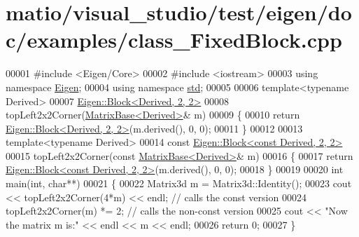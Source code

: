 \hypertarget{matio_2visual__studio_2test_2eigen_2doc_2examples_2class___fixed_block_8cpp_source}{}\section{matio/visual\+\_\+studio/test/eigen/doc/examples/class\+\_\+\+Fixed\+Block.cpp}
\label{matio_2visual__studio_2test_2eigen_2doc_2examples_2class___fixed_block_8cpp_source}

\begin{DoxyCode}
00001 \textcolor{preprocessor}{#include <Eigen/Core>}
00002 \textcolor{preprocessor}{#include <iostream>}
00003 \textcolor{keyword}{using namespace }\hyperlink{namespace_eigen}{Eigen};
00004 \textcolor{keyword}{using namespace }\hyperlink{namespacestd}{std};
00005 
00006 \textcolor{keyword}{template}<\textcolor{keyword}{typename} Derived>
00007 \hyperlink{group___core___module_class_eigen_1_1_block}{Eigen::Block<Derived, 2, 2>}
00008 topLeft2x2Corner(\hyperlink{group___core___module_class_eigen_1_1_matrix_base}{MatrixBase<Derived>}& m)
00009 \{
00010   \textcolor{keywordflow}{return} \hyperlink{group___core___module_class_eigen_1_1_block}{Eigen::Block<Derived, 2, 2>}(m.derived(), 0, 0);
00011 \}
00012 
00013 \textcolor{keyword}{template}<\textcolor{keyword}{typename} Derived>
00014 \textcolor{keyword}{const} \hyperlink{group___core___module_class_eigen_1_1_block}{Eigen::Block<const Derived, 2, 2>}
00015 topLeft2x2Corner(\textcolor{keyword}{const} \hyperlink{group___core___module_class_eigen_1_1_matrix_base}{MatrixBase<Derived>}& m)
00016 \{
00017   \textcolor{keywordflow}{return} \hyperlink{group___core___module_class_eigen_1_1_block}{Eigen::Block<const Derived, 2, 2>}(m.derived(), 0, 0);
00018 \}
00019 
00020 \textcolor{keywordtype}{int} main(\textcolor{keywordtype}{int}, \textcolor{keywordtype}{char}**)
00021 \{
00022   Matrix3d m = Matrix3d::Identity();
00023   cout << topLeft2x2Corner(4*m) << endl; \textcolor{comment}{// calls the const version}
00024   topLeft2x2Corner(m) *= 2;              \textcolor{comment}{// calls the non-const version}
00025   cout << \textcolor{stringliteral}{"Now the matrix m is:"} << endl << m << endl;
00026   \textcolor{keywordflow}{return} 0;
00027 \}
\end{DoxyCode}
